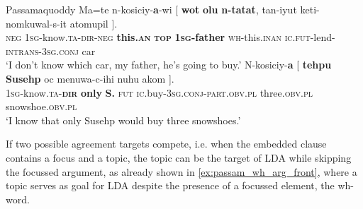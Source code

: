\documentclass[output=paper
,modfonts
,nonflat]{langsci/langscibook}
\begin{document}
\begin{exe}
\ex Passamaquoddy \citep[][282]{Bruening2001a}
	\xlist
	\ex \label{ex:passam_topmark}
		\gll Ma=te n-kosiciy-\textbf{a}-wi [ \textbf{wot} \textbf{olu} \textbf{n-tatat}, tan-iyut keti-nomkuwal-s-it atomupil ].\\
			 \textsc{neg} \textsc{1sg}-know.\textsc{ta-dir-neg} {} \textbf{this.\textsc{an}} \textbf{\textsc{top}} \textbf{\textsc{1sg}-father} \textsc{wh}-this.\textsc{inan} \textsc{ic.fut}-lend-\textsc{intrans-3sg.conj} car\\
		\glt `I don't know which car, my father, he's going to buy.'
	\ex \label{ex:passam_focmark}
		\gll N-kosiciy-\textbf{a} [ \textbf{tehpu} \textbf{Susehp} oc menuwa-c-ihi nuhu akom ].\\
			 \textsc{1sg}-know.\textsc{ta-\textbf{dir}} {} \textbf{only} \textbf{S.} \textsc{fut} \textsc{ic}.buy-\textsc{3sg.conj-part.obv.pl} three.\textsc{obv.pl} snowshoe.\textsc{obv.pl}\\
		\glt `I know that only Susehp would buy three snowshoes.'
	\endxlist
\end{exe}
If two possible agreement targets compete, i.e. when the embedded clause contains a focus and a topic, the topic can be the target of LDA while skipping the focussed argument, as already shown in \ref{ex:passam_wh_arg_front}, where a topic serves as goal for LDA despite the presence of a focussed element, the wh-word.
\end{document}

